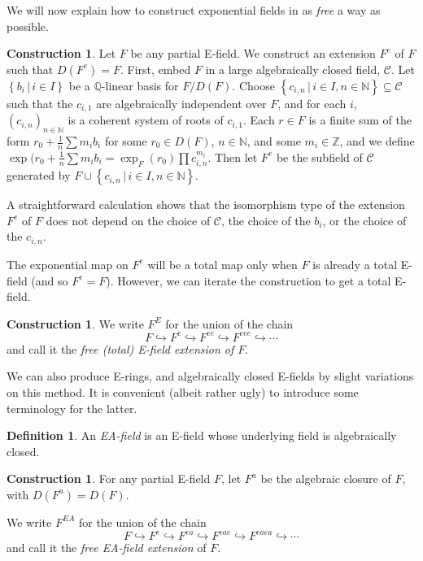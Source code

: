 \documentclass[12pt]{amsart}
\theoremstyle{definition}
\newtheorem{defn}[prop]{Definition}
\newtheorem{construction}[prop]{Construction}
\begin{document}
We will now explain how to construct exponential fields in as \emph{free} a way as possible.
\begin{construction}\label{F^e construction}
  Let $F$ be any partial E-field. We construct an extension $F^e$ of
  $F$ such that $D(F^e) = F$. First, embed $F$ in a large algebraically
  closed field, $\mathcal{C}$. Let ${\ensuremath{\left\{ {b_i} \,\left|\, {i \in I} \right.\right\}}}$ be a
  ${\ensuremath{\mathbb{Q}}}$-linear basis for $F/D(F)$. Choose ${\ensuremath{\left\{ {c_{i,n}} \,\left|\, {i \in I, n
    \in {\ensuremath{\mathbb{N}}}} \right.\right\}}} {\subseteq} \mathcal{C}$ such that the $c_{i,1}$ are
  algebraically independent over $F$, and for each $i$,
  $(c_{i,n})_{n \in {\ensuremath{\mathbb{N}}}}$ is a coherent system of roots of $c_{i,1}$. Each $r \in F$ is a finite sum of the form
  $r_0 + \frac{1}{n}\sum m_i b_i$ for some $r_0 \in D(F)$, $n \in {\ensuremath{\mathbb{N}}}$,
  and some $m_i \in {\ensuremath{\mathbb{Z}}}$, and we define $\exp(r_0 + \frac{1}{n}\sum m_i
  b_i = \exp_F(r_0)\prod c_{i,n}^{m_i}$.  Then let $F^e$ be the subfield
  of $\mathcal{C}$ generated by $F \cup {\ensuremath{\left\{ {c_{i,n}} \,\left|\, {i \in I, n \in
    {\ensuremath{\mathbb{N}}}} \right.\right\}}}$.

  A straightforward calculation shows that the isomorphism type of the
  extension $F^e$ of $F$ does not depend on the choice of
  $\mathcal{C}$, the choice of the $b_i$, or the choice of the
  $c_{i,n}$.
\end{construction}
The exponential map on $F^e$ will be a total map only when $F$ is
already a total E-field (and so $F^e = F$). However, we can iterate
the construction to get a total E-field.

\begin{construction}
  We write $F^E$ for the union of the chain
  \[F {\hookrightarrow} F^e {\hookrightarrow} F^{ee} {\hookrightarrow} F^{eee} {\hookrightarrow} \cdots\] and call it the
  \emph{free (total) E-field extension of $F$}.
\end{construction}

We can also produce E-rings, and algebraically closed E-fields by slight variations on this method. It is convenient (albeit rather ugly) to introduce some terminology for the latter.
\begin{defn}
  An \emph{EA-field} is an E-field whose underlying field is algebraically closed.
\end{defn}
\begin{construction}
  For any partial E-field $F$, let $F^a$ be the algebraic closure
  of $F$, with $D(F^a) = D(F)$.

  We write $F^{EA}$ for the union of the chain
  \[F {\hookrightarrow} F^e {\hookrightarrow} F^{ea} {\hookrightarrow} F^{eae} {\hookrightarrow} F^{eaea} {\hookrightarrow}
  \cdots\] and call it the \emph{free EA-field extension} of $F$.
\end{construction}
\end{document}
